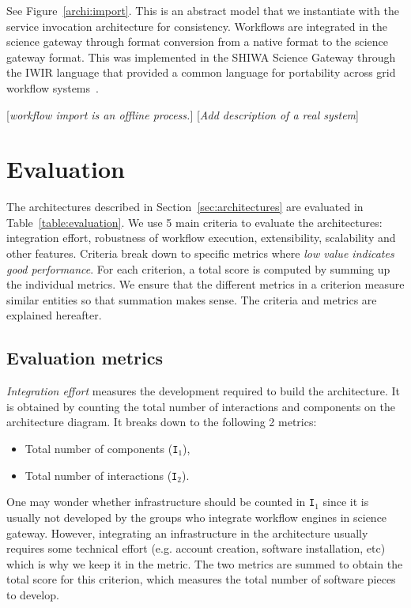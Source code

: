 \documentclass[preprint,3p,twocolumn]{elsarticle}
\newcommand{\todo}[1]{\color{blue}\xspace[\emph{#1}]\xspace\color{black}}
\begin{document}
See Figure~\ref{archi:import}. This is an abstract model that we
instantiate with the service invocation architecture for
consistency. Workflows are integrated in the science gateway through
format conversion from a native format to the science gateway
format. This was implemented in the SHIWA Science Gateway through
the IWIR language that provided a common language for portability
across grid workflow
systems~\cite{plankensteiner-prodan-etal:2013}.

\todo{workflow import is an offline process.}
\todo{Add description of a real system}

\section{Evaluation}

The architectures described in Section~\ref{sec:architectures} are
evaluated in Table~\ref{table:evaluation}. We use 5 main criteria to
evaluate the architectures: integration effort, robustness of workflow
execution, extensibility, scalability and other features. Criteria
break down to specific metrics where \emph{low value indicates good
  performance}. For each criterion, a total score is computed by
summing up the individual metrics. We ensure that the different
metrics in a criterion measure similar entities so that summation
makes sense. The
criteria and metrics are explained hereafter.

\subsection{Evaluation metrics}

\emph{Integration effort} measures the development required to build
the architecture. It is obtained by counting the total number of
interactions and components on the architecture diagram. It breaks
down to the following 2 metrics:
\begin{itemize}[leftmargin=0cm,itemindent=0.35cm,itemsep=0cm]
\item Total number of components (\texttt{I$_1$}),
\item Total number of interactions (\texttt{I$_2$}).
\end{itemize}
One may wonder whether infrastructure should be counted in
\texttt{I$_1$} since it is usually not developed by the groups who
integrate workflow engines in science gateway. However, integrating an
infrastructure in the architecture usually requires some technical
effort (e.g. account creation, software installation, etc) which is
why we keep it in the metric. The two metrics are summed to obtain the
total score for this criterion, which measures the total number of
software pieces to develop.
\end{document}
